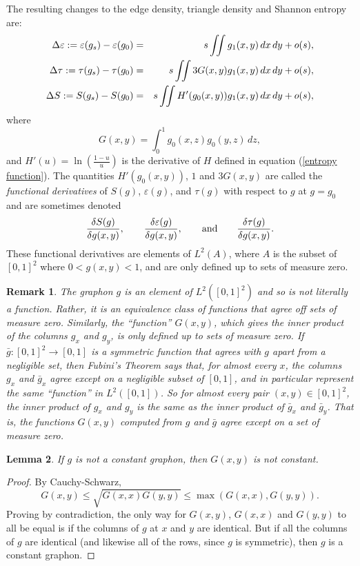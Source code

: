 \documentclass[12pt]{amsart}
\newtheorem{lemma}{Lemma}
\newtheorem{remark}[lemma]{Remark}
\newcommand\be{\begin{equation}}
\newcommand\ee{\end{equation}}
\newcommand{\tdens}{\tau}
\newcommand{\edens}{\varepsilon}
\begin{document}
{The resulting changes to the edge density, triangle density and Shannon entropy are:
\begin{eqnarray} 
\Delta \edens := \edens(g_s)-\edens(g_0) & = & s \iint g_1(x,y)\, dx \, dy + o(s), \cr
\Delta \tdens := \tdens(g_s)-\tdens(g_0) & = & s \iint 3 G(x,y) g_1(x,y)\, dx \, dy + o(s), \cr
\Delta S := S(g_s)-S(g_0) & = & s \iint H'(g_0(x,y)) g_1(x,y)\, dx \, dy + o(s), 
\end{eqnarray}
where 
\be G(x,y) = \int_0^1 g_0(x,z) g_0(y,z) \, dz, \ee 
\noindent and $H'(u)= \ln \left (\frac{1-u}{u} \right )$ is the derivative of $H$ defined in equation (\ref{entropy function}).
The quantities $H'(g_0(x,y))$, $1$ and $3 G(x,y)$ are called the {\em functional derivatives} of 
$S(g)$, $\edens(g)$, and $\tdens(g)$ with respect to $g$ at $g=g_0$ and are sometimes denoted 
\be \frac{\delta S(g)}{\delta g(x,y)}, \qquad \frac{\delta \edens(g)}{\delta g(x,y)}, \qquad 
\hbox{and} \qquad \frac{\delta \tdens(g)}{\delta g(x,y)}. \ee
These functional derivatives 
are elements of 
$L^2(A)$, where $A$ is the subset of $[0,1]^2$ where $0<g(x,y)<1$, and are only defined up to sets of measure zero. 

\begin{remark} The graphon $g$ is an element of $L^2([0,1]^2)$ and so 
is not 
literally a function. Rather, it is an equivalence class of functions that agree off  
sets of measure zero. Similarly, the ``function'' $G(x,y)$, which gives the inner product of the 
columns $g_x$ and $g_y$, is only defined up to
sets of measure zero. If $\bar g: [0,1]^2 \to
[0,1]$ is a symmetric function that agrees with $g$ apart from a negligible set, then Fubini's Theorem
says that, for almost every $x$,
the columns $g_x$ and $\bar g_x$ agree except on a negligible subset of $[0,1]$,
and in particular represent the same ``function'' in $L^2([0,1])$.
So for almost every pair $(x,y) \in [0,1]^2$, the inner product of $g_x$ and $g_y$
is the same as the inner product of $\bar g_x$ and $\bar g_y$. That is, the 
functions $G(x,y)$ computed from $g$ and $\bar g$ agree except on a set of 
measure zero. 
\end{remark} 

\begin{lemma} \label{lem:independent} If $g$ is not a constant graphon, then $G(x,y)$ is not constant.  \end{lemma} 
\begin{proof} By Cauchy-Schwarz, 
\be G(x,y) \le \sqrt{G(x,x)G(y,y)} \le \max(G(x,x), G(y,y)). \ee
Proving by contradiction, the only way for $G(x,y)$, $G(x,x)$ and $G(y,y)$ to all be equal is if the columns of $g$ at $x$ and $y$ are identical. But if all the columns of $g$ are identical (and likewise all of the rows, since $g$ is symmetric), then $g$ is a 
constant graphon.
\end{proof}

}
\end{document}
